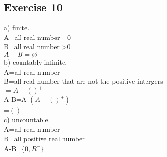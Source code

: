 \documentclass[12pt]{article}
\begin{document}
\subsection*{Exercise 10}
a) finite.\\
A=all real number =0\\
B=all real number >0\\
$A-B=\varnothing $\\

b) countably infinite.\\
A=all real number\\
B=all real number that are not the positive intergers\\
 $=A-()^+$\\
A-B=A-$(A-()^+)$\\
=$()^+$\\

c) uncountable.\\
A=all real number\\
B=all positive real number\\
A-B=$\{0,R^-\}$\\
\end{document}
